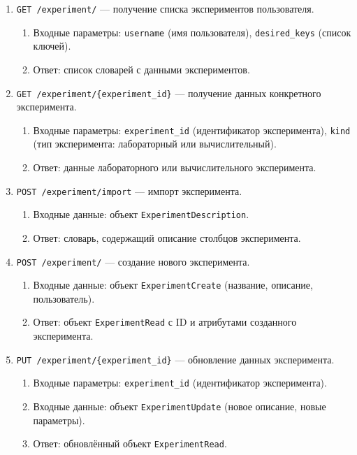\begin{enumerate}
    \item \texttt{GET /experiment/} — получение списка экспериментов пользователя.
    \begin{enumerate}[label=\arabic{enumi}.\arabic*.]
        \item Входные параметры: \texttt{username} (имя пользователя), \texttt{desired\_keys} (список ключей).
        \item Ответ: список словарей с данными экспериментов.
    \end{enumerate}

    \item \texttt{GET /experiment/\{experiment\_id\}} — получение данных конкретного эксперимента.
    \begin{enumerate}[label=\arabic{enumi}.\arabic*.]
        \item Входные параметры: \texttt{experiment\_id} (идентификатор эксперимента), \texttt{kind} (тип эксперимента: лабораторный или вычислительный).
        \item Ответ: данные лабораторного или вычислительного эксперимента.
    \end{enumerate}

    \item \texttt{POST /experiment/import} — импорт эксперимента.
    \begin{enumerate}[label=\arabic{enumi}.\arabic*.]
        \item Входные данные: объект \texttt{ExperimentDescription}.
        \item Ответ: словарь, содержащий описание столбцов эксперимента.
    \end{enumerate}

    \item \texttt{POST /experiment/} — создание нового эксперимента.
    \begin{enumerate}[label=\arabic{enumi}.\arabic*.]
        \item Входные данные: объект \texttt{ExperimentCreate} (название, описание, пользователь).
        \item Ответ: объект \texttt{ExperimentRead} с ID и атрибутами созданного эксперимента.
    \end{enumerate}

    \item \texttt{PUT /experiment/\{experiment\_id\}} — обновление данных эксперимента.
    \begin{enumerate}[label=\arabic{enumi}.\arabic*.]
        \item Входные параметры: \texttt{experiment\_id} (идентификатор эксперимента).
        \item Входные данные: объект \texttt{ExperimentUpdate} (новое описание, новые параметры).
        \item Ответ: обновлённый объект \texttt{ExperimentRead}.
    \end{enumerate}


\end{enumerate}
